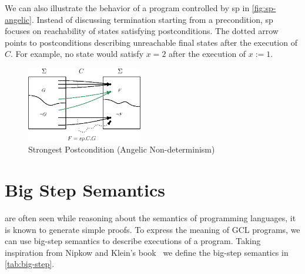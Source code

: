 We can also illustrate the behavior of a program controlled by sp in \autoref{fig:sp-angelic}. 
Instead of discussing termination starting from a precondition, sp focuses on reachability of states satisfying postconditions. 
The dotted arrow points to postconditions describing unreachable final states after the execution of $C$. 
For example, no state would satisfy $x=2$ after the execution of $x:=1$. 

\begin{figure}[ht]\centering
\includegraphics[width=0.45\textwidth]{image/sp-angelic.eps}
\caption{Strongest Postcondition (Angelic Non-determinism)}
\label{fig:sp-angelic}
\end{figure}


\section{Big Step Semantics}\label{sec:big-step}
 are often seen while reasoning about the semantics of programming languages, it is known to generate simple proofs. 
To express the meaning of GCL programs, we can use big-step semantics to describe executions of a program. 
Taking inspiration from Nipkow and Klein's book~\cite{nipkow2014} we define the big-step semantics in \autoref{tab:big-step}. 

